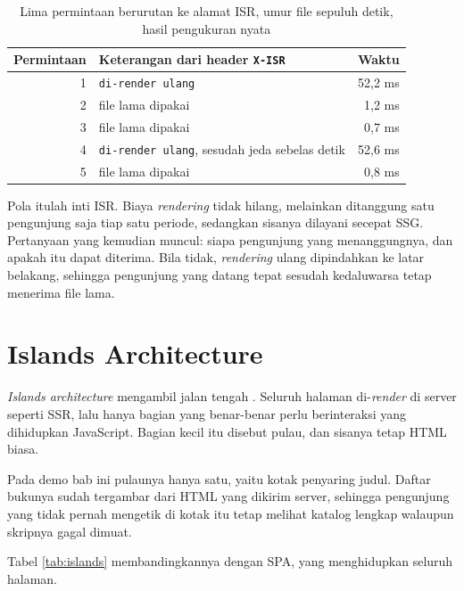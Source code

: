 \begin{table}[!htb]
  \centering
  \caption{Lima permintaan berurutan ke alamat ISR, umur file sepuluh detik,
           hasil pengukuran nyata}
  \label{tab:isr}
  \begin{tabularx}{\textwidth}{rXr}
    \hline
    \textbf{Permintaan} & \textbf{Keterangan dari header \texttt{X-ISR}} & \textbf{Waktu} \\
    \hline
    1 & \texttt{di-render ulang} & 52,2 ms \\
    \hline
    2 & file lama dipakai & 1,2 ms \\
    \hline
    3 & file lama dipakai & 0,7 ms \\
    \hline
    4 & \texttt{di-render ulang}, sesudah jeda sebelas detik & 52,6 ms \\
    \hline
    5 & file lama dipakai & 0,8 ms \\
    \hline
  \end{tabularx}
\end{table}

Pola itulah inti ISR. Biaya \textit{rendering} tidak hilang, melainkan ditanggung satu
pengunjung saja tiap satu periode, sedangkan sisanya dilayani secepat SSG.
Pertanyaan yang kemudian muncul: siapa pengunjung yang menanggungnya, dan
apakah itu dapat diterima. Bila tidak, \textit{rendering} ulang dipindahkan ke latar
belakang, sehingga pengunjung yang datang tepat sesudah kedaluwarsa tetap
menerima file lama.

\section{Islands Architecture}

\textit{Islands architecture} mengambil jalan tengah \cite{patterns-islands}.
Seluruh halaman di-\textit{render} di server seperti SSR, lalu hanya bagian yang
benar-benar perlu berinteraksi yang dihidupkan JavaScript. Bagian kecil itu
disebut pulau, dan sisanya tetap HTML biasa.

Pada demo bab ini pulaunya hanya satu, yaitu kotak penyaring judul. Daftar
bukunya sudah tergambar dari HTML yang dikirim server, sehingga pengunjung
yang tidak pernah mengetik di kotak itu tetap melihat katalog lengkap
walaupun skripnya gagal dimuat.

Tabel \ref{tab:islands} membandingkannya dengan SPA, yang menghidupkan
seluruh halaman.

